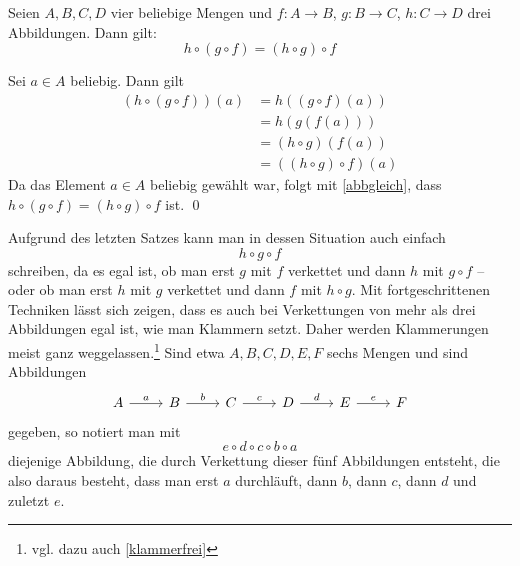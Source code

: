 \begin{sat} \label{abbass}
	Seien $A,B,C,D$ vier beliebige Mengen und $f: A \to B$, $g:B \to C$, $h:C \to D$ drei Abbildungen. Dann gilt:
	\[ h\circ (g\circ f) = (h\circ g)\circ f\]
\end{sat}
\begin{bew}
	Sei $a \in A$ beliebig. Dann gilt 
	\begin{align*}
	(h \circ (g \circ f))(a) & =h ((g \circ f )(a))\\
	& =h(g(f(a))) \\
	& =(h \circ g) (f(a)) \\
	& = ((h \circ g) \circ f) (a)	
	\end{align*}
Da das Element $a\in A$ beliebig gewählt war, folgt mit \cref{abbgleich}, dass $h\circ (g\circ f) = (h\circ g)\circ f$ ist. \qed
\end{bew}


\begin{bem}
 Aufgrund des letzten Satzes kann man in dessen Situation auch einfach
 \[ h\circ g\circ f \]
 schreiben, da es egal ist, ob man erst $g$ mit $f$ verkettet und dann $h$ mit $g\circ f$ -- oder ob man erst $h$ mit $g$ verkettet und dann $f$ mit $h\circ g$. Mit fortgeschrittenen Techniken lässt sich zeigen, dass es auch bei Verkettungen von mehr als drei Abbildungen egal ist, wie man Klammern setzt. Daher werden Klammerungen meist ganz weggelassen.\footnote{vgl. dazu auch \cref{klammerfrei}} Sind etwa $A,B,C,D,E,F$ sechs Mengen und sind Abbildungen
 \[ \begin{tikzcd}
    A \ar[r, "a"] & B \ar[r, "b"] & C \ar[r, "c"] & D \ar[r, "d"] & E \ar[r, "e"] & F
    \end{tikzcd} \]
 gegeben, so notiert man mit
 \[ e\circ d\circ c\circ b\circ a \]
 diejenige Abbildung, die durch Verkettung dieser fünf Abbildungen entsteht, die also daraus besteht, dass man erst $a$ durchläuft, dann $b$, dann $c$, dann $d$ und zuletzt $e$.
\end{bem}






